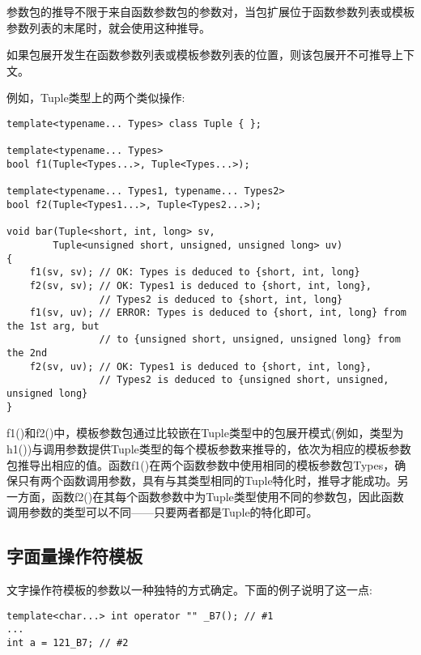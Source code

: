 参数包的推导不限于来自函数参数包的参数对，当包扩展位于函数参数列表或模板参数列表的末尾时，就会使用这种推导。

\begin{tcolorbox}[colback=webgreen!5!white,colframe=webgreen!75!black]
\hspace*{0.75cm}如果包展开发生在函数参数列表或模板参数列表的位置，则该包展开不可推导上下文。
\end{tcolorbox}

例如，Tuple类型上的两个类似操作:

\begin{lstlisting}[style=styleCXX]
template<typename... Types> class Tuple { };

template<typename... Types>
bool f1(Tuple<Types...>, Tuple<Types...>);

template<typename... Types1, typename... Types2>
bool f2(Tuple<Types1...>, Tuple<Types2...>);

void bar(Tuple<short, int, long> sv,
		Tuple<unsigned short, unsigned, unsigned long> uv)
{
	f1(sv, sv); // OK: Types is deduced to {short, int, long}
	f2(sv, sv); // OK: Types1 is deduced to {short, int, long},
				// Types2 is deduced to {short, int, long}
	f1(sv, uv); // ERROR: Types is deduced to {short, int, long} from the 1st arg, but
				// to {unsigned short, unsigned, unsigned long} from the 2nd
	f2(sv, uv); // OK: Types1 is deduced to {short, int, long},
				// Types2 is deduced to {unsigned short, unsigned, unsigned long}
}
\end{lstlisting}

f1()和f2()中，模板参数包通过比较嵌在Tuple类型中的包展开模式(例如，类型为h1())与调用参数提供Tuple类型的每个模板参数来推导的，依次为相应的模板参数包推导出相应的值。函数f1()在两个函数参数中使用相同的模板参数包Types，确保只有两个函数调用参数，具有与其类型相同的Tuple特化时，推导才能成功。另一方面，函数f2()在其每个函数参数中为Tuple类型使用不同的参数包，因此函数调用参数的类型可以不同——只要两者都是Tuple的特化即可。

\subsection{字面量操作符模板}

文字操作符模板的参数以一种独特的方式确定。下面的例子说明了这一点:

\begin{lstlisting}[style=styleCXX]
template<char...> int operator "" _B7(); // #1
...
int a = 121_B7; // #2
\end{lstlisting}

